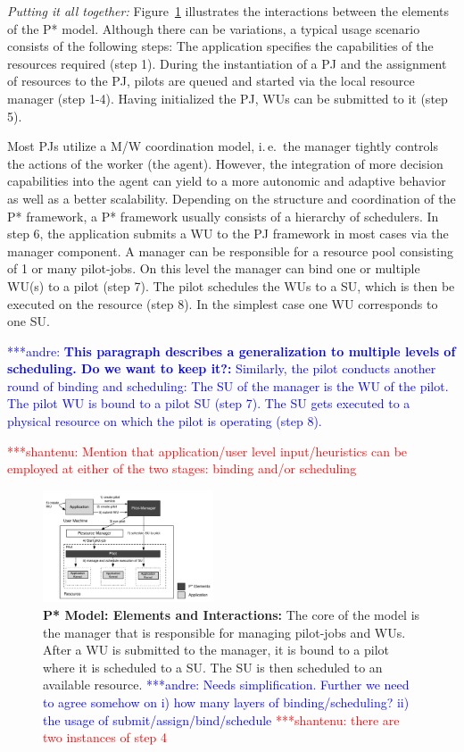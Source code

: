 \documentclass[conference,final]{IEEEtran}
\newcommand{\jhanote}[1]{ {\textcolor{red} { ***shantenu: #1 }}}
\newcommand{\alnote}[1]{ {\textcolor{blue} { ***andre: #1 }}}
\newcommand{\alnote}[1]{}
\newcommand{\jhanote}[1]{}
\newcommand{\up}{\vspace*{-1em}}
\newcommand{\upp}{\vspace*{-0.5em}}
\begin{document}
{\it Putting it all together:} Figure~\ref{fig:figures_pstar}
illustrates the interactions between the elements of the P*
model. Although there can be variations, a typical usage scenario
consists of the following steps: The application specifies the
capabilities of the resources required (step 1). During the
instantiation of a PJ and the assignment of resources to the PJ,
pilots are queued and started via the local resource manager (step
1-4). Having initialized the PJ, WUs can be submitted to it (step 5).

Most PJs utilize a M/W coordination model, i.\,e.\ the manager tightly
controls the actions of the worker (the agent). However, the
integration of more decision capabilities into the agent can yield to
a more autonomic and adaptive behavior as well as a better
scalability. Depending on the structure and coordination of the P*
framework, a P* framework usually consists of a hierarchy of
schedulers. In step 6, the application submits a WU to the PJ
framework in most cases via the manager component. A manager can be
responsible for a resource pool consisting of 1 or many pilot-jobs. On
this level the manager can bind one or multiple WU(s) to a pilot (step 7). 
The pilot schedules the WUs to a SU, which is then be executed on 
the resource (step 8). In the simplest case one WU corresponds to one SU. 

\alnote{\textbf{This paragraph describes a generalization to multiple levels of
scheduling. Do we want to keep it?:}
Similarly, the pilot
conducts another round of binding and scheduling: The SU of the
manager is the WU of the pilot. The pilot WU is bound to a pilot SU
(step 7). The SU gets executed to a physical resource on which the
pilot is operating (step 8).
}

\jhanote{Mention that application/user level input/heuristics can be
  employed at either of the two stages: binding and/or scheduling}

\begin{figure}[htbp]
    \centering\up
    \includegraphics[width=0.45\textwidth]{figures/pstar_model_single.pdf}
    \caption{ \textbf{P* Model: Elements and Interactions:} The core
      of the model is the manager that is responsible for managing
      pilot-jobs and WUs. After a WU is submitted to the manager, it
      is bound to a pilot where it is scheduled to a SU. The SU is then
      scheduled to an available resource. \alnote{Needs
        simplification. Further we need to agree somehow on i) how
        many layers of binding/scheduling? ii) the usage of
        submit/assign/bind/schedule} \jhanote{there are two instances
        of step 4} \upp\upp}
    \label{fig:figures_pstar}
\end{figure}
\end{document}
